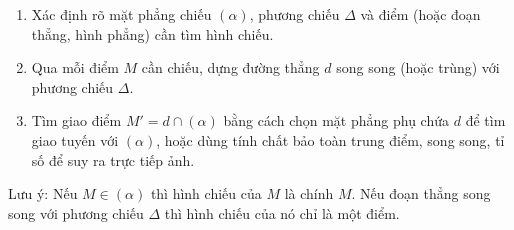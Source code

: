 \begin{enumerate}
\item Xác định rõ mặt phẳng chiếu $(\alpha)$, phương chiếu $\Delta$ và điểm (hoặc đoạn thẳng, hình phẳng) cần tìm hình chiếu.
\item Qua mỗi điểm $M$ cần chiếu, dựng đường thẳng $d$ song song (hoặc trùng) với phương chiếu $\Delta$.
\item Tìm giao điểm $M' = d \cap (\alpha)$ bằng cách chọn mặt phẳng phụ chứa $d$ để tìm giao tuyến với $(\alpha)$, hoặc dùng tính chất bảo toàn trung điểm, song song, tỉ số để suy ra trực tiếp ảnh.
\end{enumerate}
Lưu ý: Nếu $M \in (\alpha)$ thì hình chiếu của $M$ là chính $M$. Nếu đoạn thẳng song song với phương chiếu $\Delta$ thì hình chiếu của nó chỉ là một điểm.
